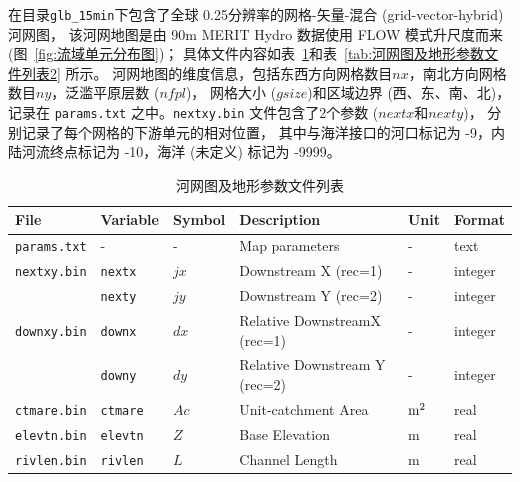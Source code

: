 在目录\texttt{glb\_15min}下包含了全球 0.25\textdegree 分辨率的网格-矢量-混合 (grid-vector-hybrid) 河网图，
该河网地图是由 90m MERIT Hydro 数据使用 FLOW 模式升尺度而来 (图~\ref{fig:流域单元分布图})；
具体文件内容如表~\ref{tab:河网图及地形参数文件列表}和表~\ref{tab:河网图及地形参数文件列表2} 所示。
河网地图的维度信息，包括东西方向网格数目$nx$，南北方向网格数目$ny$，泛滥平原层数 ($nfpl$)，
网格大小 ($gsize$)和区域边界 (西、东、南、北)，记录在 \texttt{params.txt} 之中。\texttt{nextxy.bin} 文件包含了2个参数 ($nextx$和$nexty$)，
分别记录了每个网格的下游单元的相对位置，
其中与海洋接口的河口标记为 -9，内陆河流终点标记为 -10，海洋 (未定义) 标记为 -9999。

\begin{table}[]
\centering
\caption{河网图及地形参数文件列表}
\label{tab:河网图及地形参数文件列表}
    \begin{tabular}[h]{p{3.5cm}p{1.5cm}p{1.5cm}p{5cm}p{1cm}p{1cm}}  %
    \toprule
    File              & Variable & Symbol                        & Description                                  & Unit    & Format  \\ \midrule
    \texttt{params.txt}        & -        & -                             & Map parameters                     & -         & text    \\
    \texttt{nextxy.bin}        & \texttt{nextx}    & $jx$                         & Downstream X (rec=1)         & -         & integer \\
                                       & \texttt{nexty}    & $jy$                         & Downstream Y (rec=2)            & -        & integer \\
    \texttt{downxy.bin}      & \texttt{downx}   & $dx$                        & Relative DownstreamX (rec=1)   & -   & integer \\
                                       & \texttt{downy}   & $dy$                      & Relative Downstream Y (rec=2)   & -    & integer \\
    \texttt{ctmare.bin}       & \texttt{ctmare}   & $Ac$                     & Unit-catchment Area                     & $\rm m^2$   & real    \\
    \texttt{elevtn.bin}        & \texttt{elevtn}    & $Z$                        & Base Elevation                         & m       & real    \\
    \texttt{rivlen.bin}         & \texttt{rivlen}    & $L$                         & Channel Length                        & m       & real    \\

\end{tabular}
\end{table}
